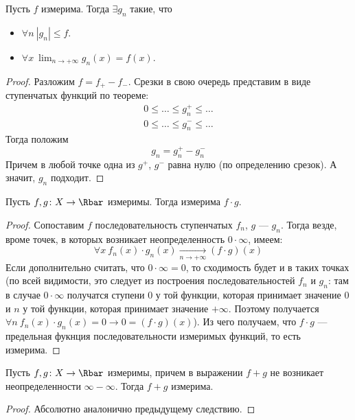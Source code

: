 \begin{corollary}
	Пусть $f$ измерима. Тогда $\exists g_n$ такие, что
\begin{itemize}
	\item $\forall n~ |g_n| \leqslant f$.
	\item $\displaystyle \forall x~ \lim_{n \to +\infty}{g_n(x)} = f(x)$.
\end{itemize}
\end{corollary}
\begin{proof}
	Разложим $f = f_{+} - f_{-}$. Срезки в свою очередь представим в 
	виде ступенчатых функций по теореме:
\begin{align*}
	0 \leqslant \ldots \leqslant g^{+}_n \leqslant \ldots \\
	0 \leqslant \ldots \leqslant g^{-}_n \leqslant \ldots 
\end{align*}
	Тогда положим
\[
	g_n = g^{+}_n - g^{-}_n
\]
	Причем в любой точке одна из $g^{+}$, $g^{-}$ равна нулю (по определению срезок).
	А значит, $g_n$ подходит.
\end{proof}

\begin{corollary}
	Пусть $f, g\colon X \to \Rbar$ измеримы. Тогда измерима $f \cdot g$.
\end{corollary}
\begin{proof}
	Сопоставим $f$ последовательность ступенчатых $f_n$, $g$ --- $g_n$. Тогда
	везде, вроме точек, в которых возникает неопределенность $0 \cdot \infty$, 
	имеем:
\[
	\forall x~ f_n(x) \cdot g_n(x) \xrightarrow[n \to +\infty]{} (f \cdot g)(x)
\]
	Если дополнительно считать, что $0 \cdot \infty = 0$, то сходимость будет и в 
	таких точках (по всей видимости, это следует из построения последовательностей
	$f_n$ и $g_n$: там в случае $0 \cdot \infty$ получатся ступени $0$ у той функции,
	которая принимает значение $0$ и $n$ у той функции, которая принимает значение 
	$+\infty$. Поэтому получается $\forall n~ f_n(x) \cdot g_n(x) = 0 \to 0 
	= (f \cdot g)(x)$).
	Из чего получаем, что $f \cdot g$ --- предельная фукнция последовательности
	измеримых функций, то есть измерима.
\end{proof}

\begin{corollary}
	Пусть $f, g\colon X \to \Rbar$ измеримы, причем в выражении 
	$f + g$ не возникает неопределенности $\infty - \infty$.
	Тогда $f + g$ измерима.
\end{corollary}
\begin{proof}
	Абсолютно аналонично предыдущему следствию.
\end{proof}

